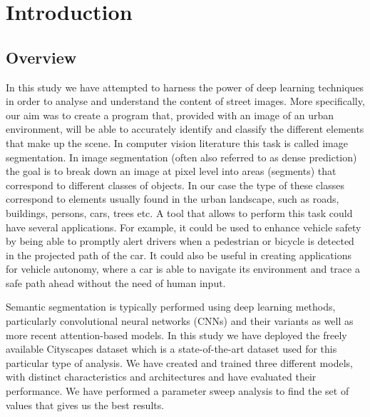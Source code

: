 \section{Introduction}
\subsection{Overview}

In this study we have attempted to harness the power of deep learning techniques in order to analyse and understand the content of street images. More specifically, our aim was to create a program that, provided with an image of an urban environment, will be able to accurately identify and classify the different elements that make up the scene. In computer vision literature this task is called image segmentation. In image segmentation (often also referred to as dense prediction) the goal is to break down an image at pixel level into areas (segments) that correspond to different classes of objects. In our case the type of these classes correspond to elements usually found in the urban landscape, such as roads, buildings, persons, cars, trees etc. A tool that allows to perform this task could have several applications. For example, it could be used to enhance vehicle safety by being able to promptly alert drivers when a pedestrian or bicycle is detected in the projected path of the car. It could also be useful in creating applications for vehicle autonomy, where a car is able to navigate its environment and trace a safe path ahead without the need of human input. 

Semantic segmentation is typically performed using deep learning methods, particularly convolutional neural networks (CNNs) and their variants as well as more recent attention-based models. In this study we have deployed the freely available Cityscapes dataset \cite{DBLP:journals/corr/CordtsORREBFRS16} which is a state-of-the-art dataset used for this particular type of analysis. We have created and trained three different models, with distinct characteristics and architectures and have evaluated their performance. We have performed a parameter sweep analysis to find the set of values that gives us the best results. 

